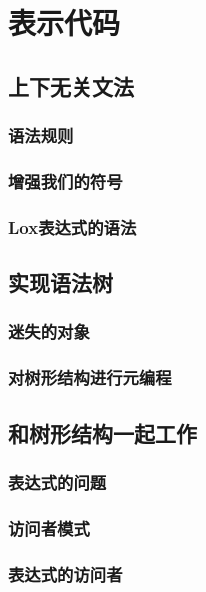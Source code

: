 \documentclass[cn,10pt,math=newtx,citestyle=gb7714-2015,bibstyle=gb7714-2015]{elegantbook}
\begin{document}
\chapter{表示代码}

\section{上下无关文法}

\subsection{语法规则}

\subsection{增强我们的符号}

\subsection{Lox表达式的语法}

\section{实现语法树}

\subsection{迷失的对象}

\subsection{对树形结构进行元编程}

\section{和树形结构一起工作}

\subsection{表达式的问题}

\subsection{访问者模式}

\subsection{表达式的访问者}
\end{document}
